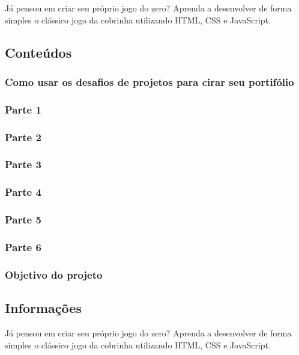 \documentclass[12pt,a4paper]{article}
\begin{document}
	Já pensou em criar seu próprio jogo do zero? Aprenda a desenvolver de forma simples o clássico jogo da cobrinha utilizando HTML, CSS e JavaScript.
	
	\subsection{Conteúdos}
	\subsubsection{Como usar os desafios de projetos para cirar seu portifólio}
	
	\subsubsection{Parte 1}
	
	\subsubsection{Parte 2}
	
	\subsubsection{Parte 3}
	
	\subsubsection{Parte 4}
	
	\subsubsection{Parte 5}
	
	\subsubsection{Parte 6}
	
	\subsubsection{Objetivo do projeto}
	
	\subsection{Informações}
	
	Já pensou em criar seu próprio jogo do zero? Aprenda a desenvolver de forma simples o clássico jogo da cobrinha utilizando HTML, CSS e JavaScript.
	
\end{document}
